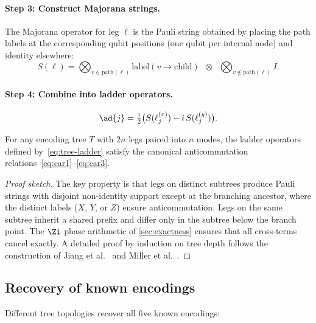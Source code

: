 \paragraph{Step 3: Construct Majorana strings.}
The Majorana operator for leg $\ell$ is the Pauli string obtained by
placing the path labels at the corresponding qubit positions (one
qubit per internal node) and identity elsewhere:
\begin{equation}
  S(\ell) = \bigotimes_{v \in \mathrm{path}(\ell)}
    \text{label}(v \to \text{child}) \;\;\otimes\;\;
    \bigotimes_{v \notin \mathrm{path}(\ell)} I.
  \label{eq:path-pauli}
\end{equation}

\paragraph{Step 4: Combine into ladder operators.}
\begin{equation}
  \ad{j} = \tfrac{1}{2}\bigl(S(\ell_j^{(x)}) - i\, S(\ell_j^{(y)})\bigr).
  \label{eq:tree-ladder}
\end{equation}

\begin{theorem}
\label{thm:tree-car}
For any encoding tree $T$ with $2n$ legs paired into $n$ modes, the
ladder operators defined by~\eqref{eq:tree-ladder} satisfy the canonical
anticommutation relations~\eqref{eq:car1}--\eqref{eq:car3}.
\end{theorem}

\begin{proof}[Proof sketch]
The key property is that legs on distinct subtrees produce Pauli strings
with disjoint non-identity support except at the branching ancestor,
where the distinct labels ($X$, $Y$, or $Z$) ensure anticommutation.
Legs on the same subtree inherit a shared prefix and differ only in the
subtree below the branch point.  The $\Zi$ phase arithmetic of
\cref{sec:exactness} ensures that all cross-terms cancel exactly.  A
detailed proof by induction on tree depth follows the
construction of Jiang et al.~\cite{jiang2020} and Miller et
al.~\cite{miller2023bonsai}.
\end{proof}

\subsection{Recovery of known encodings}

Different tree topologies recover all five known encodings:

